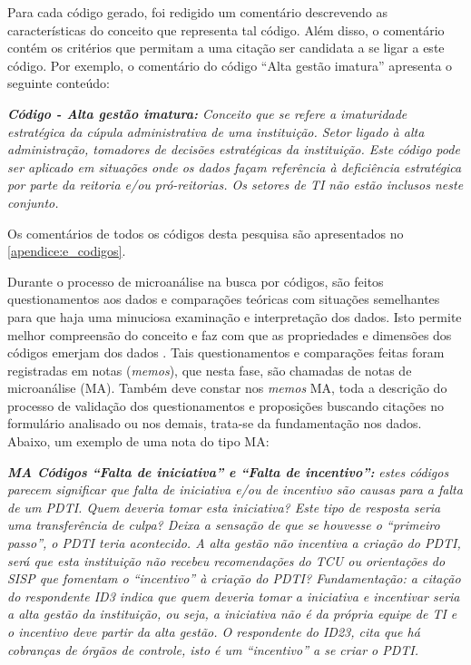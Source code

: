 Para cada código gerado, foi redigido um comentário descrevendo as características do conceito que representa tal código. Além disso, o comentário contém os critérios que permitam a uma citação ser candidata a se ligar a este código. Por exemplo, o comentário do código ``Alta gestão imatura''  apresenta o seguinte conteúdo:

\textit{\textbf{Código - Alta gestão imatura:}
Conceito que se refere a imaturidade estratégica da cúpula administrativa de uma instituição. Setor ligado à alta administração, tomadores de decisões estratégicas da instituição.
Este código pode ser aplicado em situações onde os dados façam referência à deficiência estratégica por parte da reitoria e/ou pró-reitorias. Os setores de TI não estão inclusos neste conjunto.}

Os comentários de todos os códigos desta pesquisa são apresentados no \autoref{apendice:e_codigos}.

Durante o processo de microanálise na busca por códigos, são feitos questionamentos aos dados e comparações teóricas com situações semelhantes para que haja uma minuciosa examinação e interpretação dos dados. Isto permite melhor compreensão do conceito e faz com que as propriedades e dimensões dos códigos emerjam dos dados \cite{corbin:98}. Tais questionamentos e comparações feitas foram registradas em notas (\textit{memos}), que nesta fase, são chamadas de notas de microanálise (MA). Também deve constar nos \textit{memos} MA, toda a descrição do processo de validação dos questionamentos e proposições buscando citações no formulário analisado ou nos demais, trata-se da fundamentação nos dados. Abaixo, um exemplo de uma nota do tipo MA:

\textit{\textbf{MA Códigos ``Falta de iniciativa''  e ``Falta de incentivo'': }}
\textit{
estes códigos parecem significar que falta de iniciativa e/ou de incentivo são causas para a falta de um PDTI. Quem deveria tomar esta iniciativa? Este tipo de resposta seria uma transferência de culpa? Deixa a sensação de que se houvesse o ``primeiro passo'', o PDTI teria acontecido. A alta gestão não incentiva a criação do PDTI, será que esta instituição não recebeu recomendações do TCU ou orientações do SISP que fomentam o ``incentivo'' à criação do PDTI?
Fundamentação: a citação do respondente ID3 indica que quem deveria tomar a iniciativa e incentivar seria a alta gestão da instituição, ou seja, a iniciativa não é da própria equipe de TI e o incentivo deve partir da alta gestão. 
O respondente do ID23, cita que há cobranças de órgãos de controle, isto é um ``incentivo'' a se criar o PDTI.}

